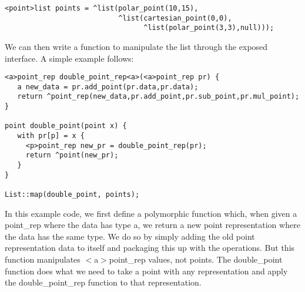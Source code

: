 \documentclass[titlepage,10pt]{article}
\begin{document}

\begin{verbatim}
<point>list points = ^list(polar_point(10,15),
                           ^list(cartesian_point(0,0),
                                 ^list(polar_point(3,3),null)));
\end{verbatim}

We can then write a function to manipulate the list through the exposed
interface.  A simple example follows:


\begin{verbatim}
<a>point_rep double_point_rep<a>(<a>point_rep pr) {
   a new_data = pr.add_point(pr.data,pr.data);
   return ^point_rep(new_data,pr.add_point,pr.sub_point,pr.mul_point);
}

point double_point(point x) {
   with pr[p] = x {
     <p>point_rep new_pr = double_point_rep(pr);
     return ^point(new_pr);
   }
}

List::map(double_point, points);
\end{verbatim}


In this example code, we first define a polymorphic function which, when
given a point{\_}rep where the data has type a, we return a new point
representation where the data has the same type.  We do so by simply
adding the old point representation data to itself and packaging this up
with the operations.  But this function manipulates $<$a$>$point{\_}rep
values, not points.  The double{\_}point function does what we need to
take a point with any representation and apply the
double{\_}point{\_}rep function to that representation.
\end{document}
